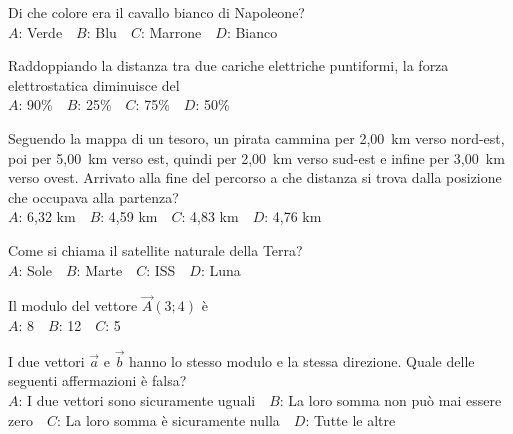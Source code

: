 \def\mcquestionnumber{12}


\mcquestionheader Di che colore era il cavallo bianco di Napoleone?\\
{$A$}: Verde\ \ {$B$}: Blu\ \ {$C$}: Marrone\ \ {$D$}: Bianco\ \ 

\mcquestionfooter



\mcpaperfooter

\def\mcserialnumber{22}
\mcpaperheader


\def\mcquestionnumber{1}


\mcquestionheader Raddoppiando la distanza tra due cariche elettriche puntiformi, la forza elettrostatica diminuisce del\\
{$A$}: 90\%\ \ {$B$}: 25\%\ \ {$C$}: 75\%\ \ {$D$}: 50\%\ \ 

\mcquestionfooter



\def\mcquestionnumber{2}


\mcquestionheader Seguendo la mappa di un tesoro, un pirata cammina per 2,00~km verso nord-est, poi per 5,00~km verso est, quindi per 2,00~km verso sud-est e infine per 3,00~km verso ovest. Arrivato alla fine del percorso a che distanza si trova dalla posizione che occupava alla partenza?\\
{$A$}: 6,32 km\ \ {$B$}: 4,59 km\ \ {$C$}: 4,83 km\ \ {$D$}: 4,76 km\ \ 

\mcquestionfooter



\def\mcquestionnumber{3}


\mcquestionheader Come si chiama il satellite naturale della Terra?\\
{$A$}: Sole\ \ {$B$}: Marte\ \ {$C$}: ISS\ \ {$D$}: Luna\ \ 

\mcquestionfooter



\def\mcquestionnumber{4}


\mcquestionheader Il modulo del vettore $\vec{A}(3;4)$ è\\
{$A$}: 8\ \ {$B$}: 12\ \ {$C$}: 5\ \ 

\mcquestionfooter



\def\mcquestionnumber{5}


\mcquestionheader I due vettori $\vec{a}$ e $\vec{b}$ hanno lo stesso modulo e la stessa direzione. Quale delle seguenti affermazioni è falsa?\\
{$A$}: I due vettori sono sicuramente uguali\ \ {$B$}: La loro somma non può mai essere zero\ \ {$C$}: La loro somma è sicuramente nulla\ \ {$D$}: Tutte le altre\ \ 


